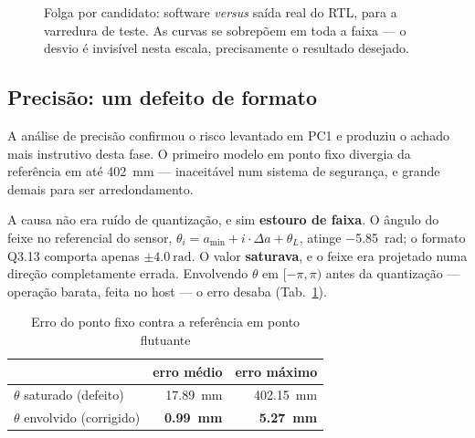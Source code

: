 \documentclass[conference]{IEEEtran}
\begin{document}
\begin{figure}[!t]
\centering
{}
\caption{Folga por candidato: software \emph{versus} sa\'ida real do RTL, para a
varredura de teste. As curvas se sobrep\~oem em toda a faixa --- o desvio \'e
invis\'ivel nesta escala, precisamente o resultado desejado.}
\label{fig:swhw}
\end{figure}

\subsection{Precis\~ao: um defeito de formato}
\label{sec:prec}
A an\'alise de precis\~ao confirmou o risco levantado em PC1 e produziu o achado
mais instrutivo desta fase. O primeiro modelo em ponto fixo divergia da
refer\^encia em at\'e \SI{402}{\milli\metre} --- inaceit\'avel num sistema de
seguran\c{c}a, e grande demais para ser arredondamento.

A causa n\~ao era ru\'ido de quantiza\c{c}\~ao, e sim \textbf{estouro de faixa}. O
\^angulo do feixe no referencial do sensor,
$\theta_i = a_{\min} + i\cdot\Delta a + \theta_L$, atinge \SI{-5.85}{\radian}; o
formato Q3.13 comporta apenas $\pm\SI{4.0}{\radian}$. O valor \textbf{saturava}, e
o feixe era projetado numa dire\c{c}\~ao completamente errada. Envolvendo
$\theta$ em $[-\pi,\pi)$ antes da quantiza\c{c}\~ao --- opera\c{c}\~ao barata,
feita no host --- o erro desaba (Tab.~\ref{tab:prec}).

\begin{table}[!t]
\caption{Erro do ponto fixo contra a refer\^encia em ponto flutuante}
\label{tab:prec}
\centering\footnotesize
\begin{tabular}{@{}lrr@{}}
\toprule
 & \textbf{erro m\'edio} & \textbf{erro m\'aximo} \\
\midrule
$\theta$ saturado (defeito) & \SI{17.89}{\milli\metre} & \SI{402.15}{\milli\metre} \\
$\theta$ envolvido (corrigido) & \textbf{\SI{0.99}{\milli\metre}} & \textbf{\SI{5.27}{\milli\metre}} \\
\bottomrule
\end{tabular}
\end{table}
\end{document}
